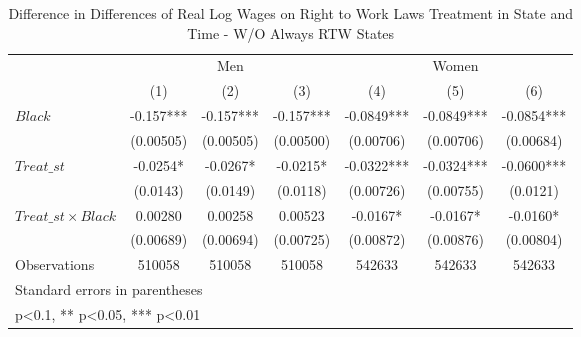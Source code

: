 \begin{table}[htbp]\centering
\def\sym#1{\ifmmode^{#1}\else\(^{#1}\)\fi}
\caption{Difference in Differences of Real Log Wages on Right to Work Laws Treatment in State and Time - W/O Always RTW States}
\begin{tabular}{l*{6}{c}}
\hline\hline
                    &\multicolumn{3}{c}{Men}                        &\multicolumn{3}{c}{Women}                      \\\cmidrule(lr){2-4}\cmidrule(lr){5-7}
                    &\multicolumn{1}{c}{(1)}   &\multicolumn{1}{c}{(2)}   &\multicolumn{1}{c}{(3)}   &\multicolumn{1}{c}{(4)}   &\multicolumn{1}{c}{(5)}   &\multicolumn{1}{c}{(6)}   \\
\hline
$ Black $           &      -0.157***&      -0.157***&      -0.157***&     -0.0849***&     -0.0849***&     -0.0854***\\
                    &   (0.00505)   &   (0.00505)   &   (0.00500)   &   (0.00706)   &   (0.00706)   &   (0.00684)   \\
[1em]
$ Treat\_{st} $      &     -0.0254*  &     -0.0267*  &     -0.0215*  &     -0.0322***&     -0.0324***&     -0.0600***\\
                    &    (0.0143)   &    (0.0149)   &    (0.0118)   &   (0.00726)   &   (0.00755)   &    (0.0121)   \\
[1em]
$ Treat\_{st} \times Black $&     0.00280   &     0.00258   &     0.00523   &     -0.0167*  &     -0.0167*  &     -0.0160*  \\
                    &   (0.00689)   &   (0.00694)   &   (0.00725)   &   (0.00872)   &   (0.00876)   &   (0.00804)   \\
\hline
Observations        &      510058   &      510058   &      510058   &      542633   &      542633   &      542633   \\
\hline\hline
\multicolumn{7}{l}{\footnotesize Standard errors in parentheses}\\
\multicolumn{7}{l}{\footnotesize * p<0.1, ** p<0.05, *** p<0.01}\\
\end{tabular}
\end{table}
